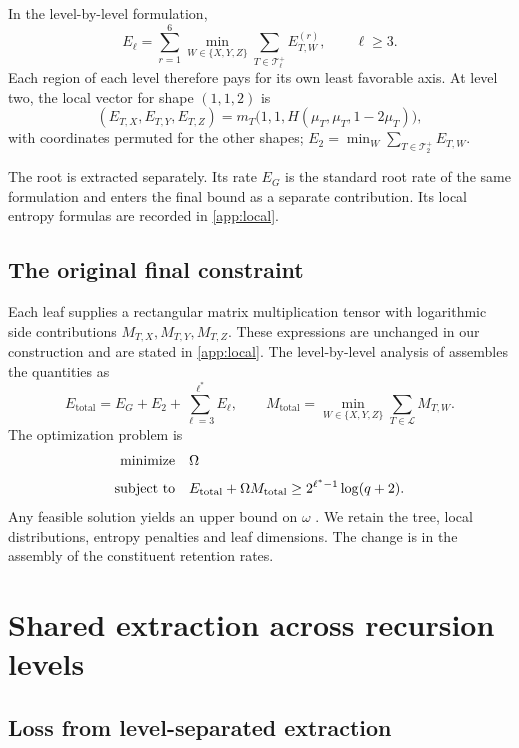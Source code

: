 \documentclass[11pt,a4paper]{article}
\newcommand{\Tpos}[1]{\mathcal T_{#1}^{+}}
\newcommand{\Etot}{E_{\mathrm{total}}}
\newcommand{\Mtot}{M_{\mathrm{total}}}
\newcommand{\WW}{\{X,Y,Z\}}
\begin{document}
In the level-by-level formulation,
\begin{equation}\label{eq:old-level}
E_\ell=\sum_{r=1}^6\min_{W\in\WW}
\sum_{T\in\Tpos\ell}E_{T,W}^{(r)},\qquad \ell\ge3.
\end{equation}
Each region of each level therefore pays for its own least favorable axis. At level two, the local vector for shape $(1,1,2)$ is
\[
(E_{T,X},E_{T,Y},E_{T,Z})
=m_T\bigl(1,1,H(\mu_T,\mu_T,1-2\mu_T)\bigr),
\]
with coordinates permuted for the other shapes; $E_2=\min_W\sum_{T\in\Tpos2}E_{T,W}$.

The root is extracted separately. Its rate $E_G$ is the standard root rate of the same formulation and enters the final bound as a separate contribution. Its local entropy formulas are recorded in \cref{app:local}.

\subsection{The original final constraint}

Each leaf supplies a rectangular matrix multiplication tensor with logarithmic side contributions $M_{T,X},M_{T,Y},M_{T,Z}$. These expressions are unchanged in our construction and are stated in \cref{app:local}. The level-by-level analysis of \citet{alman2025} assembles the quantities as
\begin{equation}\label{eq:old-total}
\Etot=E_G+E_2+\sum_{\ell=3}^{\ell^*}E_\ell,
\qquad
\Mtot=\min_{W\in\WW}\sum_{T\in\mathcal L}M_{T,W}.
\end{equation}
The optimization problem is
\begin{equation}\label{eq:old-opt}
\begin{aligned}
\operatorname{minimize}\quad &\Omega\\[3pt]
\text{\normalfont subject to}\quad &\Etot+\Omega\Mtot\ge2^{\ell^*-1}\log(q+2).
\end{aligned}
\end{equation}
Any feasible solution yields an upper bound on $\omega$ \citep{alman2025,dupont2026}. We retain the tree, local distributions, entropy penalties and leaf dimensions. The change is in the assembly of the constituent retention rates.

\section{Shared extraction across recursion levels}\label{sec:shared}

\subsection{Loss from level-separated extraction}
\end{document}
